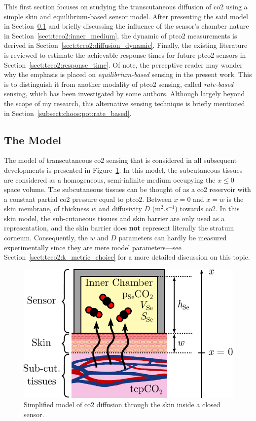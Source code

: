 This first section focuses on studying the transcutaneous diffusion of \gls{co2} using a simple skin and equilibrium-based sensor model. After presenting the said model in Section~\ref{sect:tcco2:model} and briefly discussing the influence of the sensor's chamber nature in Section~\ref{sect:tcco2:inner_medium}, the dynamic of \gls{ptco2} measurements is derived in Section~\ref{sect:tcco2:diffusion_dynamic}. Finally, the existing literature is reviewed to estimate the achievable response times for future \gls{ptco2} sensors in Section~\ref{sect:tcco2:response_time}. Of note, the perceptive reader may wonder why the emphasis is placed on \emph{equilibrium-based} sensing in the present work. This is to distinguish it from another modality of \gls{ptco2} sensing, called \emph{rate-based} sensing, which has been investigated by some authors. Although largely beyond the scope of my research, this alternative sensing technique is briefly mentioned in Section~\ref{subsect:choos:pot:rate_based}.

\subsection{The Model}\label{sect:tcco2:model}

The model of transcutaneous \gls{co2} sensing that is considered in all subsequent developments is presented in Figure~\ref{fig:tcco2:diffusion_model}. In this model, the subcutaneous tissues are considered as a homogeneous, semi-infinite medium occupying the $x\leq 0$ space volume. The subcutaneous tissues can be thought of as a \gls{co2} reservoir with a constant partial \gls{co2} pressure equal to \gls{ptco2}. Between $x=0$ and $x=w$ is the skin membrane, of thickness $w$ and diffusivity $D$ (m$^2$.s$^{-1}$) towards \gls{co2}. In this skin model, the sub-cutaneous tissues and skin barrier are only used as a representation, and the skin barrier does \textbf{not} represent literally the stratum corneum. Consequently, the $w$ and $D$ parameters can hardly be measured experimentally since they are mere model parameters---see Section~\ref{sect:tcco2:k_metric_choice} for a more detailed discussion on this topic.

\begin{figure}
	\centering
	\includegraphics[scale=0.7]{1_main_matter/tcco2_figures/diffusion_model.pdf}
	\caption{Simplified model of \gls{co2} diffusion through the skin inside a closed sensor.}
	\label{fig:tcco2:diffusion_model}
\end{figure}

